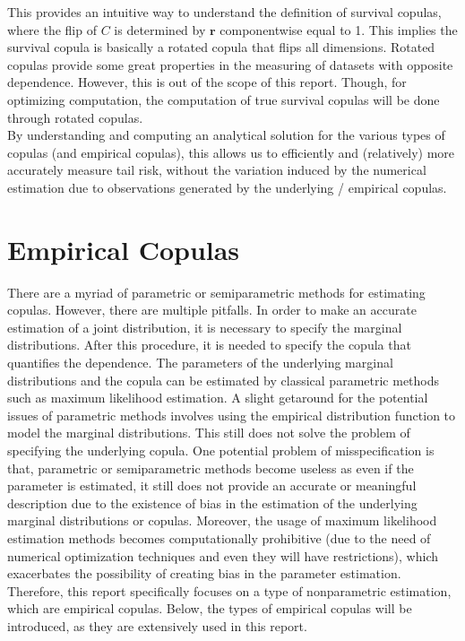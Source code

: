 \documentclass[12pt]{report}
\newcommand{\1}{\mathbf{1}}
\begin{document}
\begin{flushleft}
This provides an intuitive way to understand the definition of survival copulas, where the flip of $C$ is determined by $\textbf{r}$ componentwise equal to 1. This implies the survival copula is basically a rotated copula that flips all dimensions. Rotated copulas provide some great properties in the measuring of datasets with opposite dependence. However, this is out of the scope of this report. Though, for optimizing computation, the computation of true survival copulas will be done through rotated copulas.\\
\vspace{0.5cm}
By understanding and computing an analytical solution for the various types of copulas (and empirical copulas), this allows us to efficiently and (relatively) more accurately measure tail risk, without the variation induced by the numerical estimation due to observations generated by the underlying / empirical copulas. 

\newpage
\section{Empirical Copulas}
\vspace{0.5cm}
There are a myriad of parametric or semiparametric methods for estimating copulas. However, there are multiple pitfalls. In order to make an accurate estimation of a joint distribution, it is necessary to specify the marginal distributions. After this procedure, it is needed to specify the copula that quantifies the dependence. The parameters of the underlying marginal distributions and the copula can be estimated by classical parametric methods such as maximum likelihood estimation. A slight getaround for the potential issues of parametric methods involves using the empirical distribution function to model the marginal distributions. This still does not solve the problem of specifying the underlying copula. One potential problem of misspecification is that, parametric or semiparametric methods become useless as even if the parameter is estimated, it still does not provide an accurate or meaningful description due to the existence of bias in the estimation of the underlying marginal distributions or copulas. Moreover, the usage of maximum likelihood estimation methods becomes computationally prohibitive (due to the need of numerical optimization techniques and even they will have restrictions), which exacerbates the possibility of creating bias in the parameter estimation. \\
\vspace{0.5cm}
Therefore, this report specifically focuses on a type of nonparametric estimation, which are empirical copulas. Below, the types of empirical copulas will be introduced, as they are extensively used in this report.


\end{flushleft}
\end{document}

